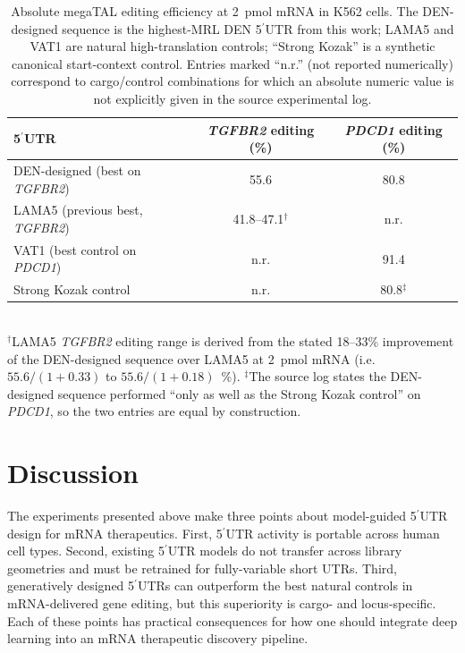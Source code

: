 \documentclass[11pt]{article}
\begin{document}
\begin{table}[htbp]
\centering
\caption{Absolute megaTAL editing efficiency at 2~pmol mRNA in K562
cells. The DEN-designed sequence is the highest-MRL DEN 5$^\prime$UTR
from this work; LAMA5 and VAT1 are natural high-translation controls;
``Strong Kozak'' is a synthetic canonical start-context control. Entries
marked ``n.r.'' (not reported numerically) correspond to cargo/control
combinations for which an absolute numeric value is not explicitly
given in the source experimental log.}
\label{tab:editing}
\begin{tabular}{lcc}
\toprule
5$^\prime$UTR & \emph{TGFBR2} editing (\%) & \emph{PDCD1} editing (\%) \\
\midrule
DEN-designed (best on \emph{TGFBR2}) & 55.6 & 80.8 \\
LAMA5 (previous best, \emph{TGFBR2}) & 41.8--47.1$^{\dagger}$ & n.r. \\
VAT1 (best control on \emph{PDCD1}) & n.r. & 91.4 \\
Strong Kozak control & n.r. & 80.8$^{\ddagger}$ \\
\bottomrule
\end{tabular}
\\[2pt]
{\footnotesize
$^{\dagger}$LAMA5 \emph{TGFBR2} editing range is derived from the
stated 18--33\% improvement of the DEN-designed sequence over LAMA5
at 2~pmol mRNA (i.e.\ $55.6/(1+0.33)$ to $55.6/(1+0.18)$~\%).
$^{\ddagger}$The source log states the DEN-designed sequence performed
``only as well as the Strong Kozak control'' on \emph{PDCD1}, so the
two entries are equal by construction.}
\end{table}

\section{Discussion}

The experiments presented above make three points about model-guided
5$^\prime$UTR design for mRNA therapeutics. First, 5$^\prime$UTR
activity is portable across human cell types. Second, existing
5$^\prime$UTR models do not transfer across library geometries and
must be retrained for fully-variable short UTRs. Third, generatively
designed 5$^\prime$UTRs can outperform the best natural controls in
mRNA-delivered gene editing, but this superiority is cargo- and
locus-specific. Each of these points has practical consequences for
how one should integrate deep learning into an mRNA therapeutic
discovery pipeline.
\end{document}
